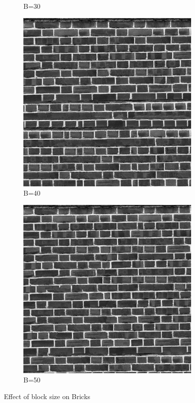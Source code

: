 \documentclass[10pt,twocolumn,letterpaper]{article}
\begin{document}
\begin{figure}[h]
\begin{subfigure}[h]{0.2\textwidth}
       \caption{B=30}
   \end{subfigure}
   \hfill
   \begin{subfigure}[h]{0.2\textwidth}
       \centering
       \includegraphics[scale=0.15]{../results/syn/out_brick_bw_B_40.png}
       \caption{B=40}
   \end{subfigure}
   \begin{subfigure}[h]{0.2\textwidth}
       \centering
       \includegraphics[scale=0.15]{../results/syn/out_brick_bw_B_50.png}
       \caption{B=50}
   \end{subfigure}
   \caption{Effect of block size on Bricks}
   \label{fig:brick_bs}
\end{figure}
\end{document}
